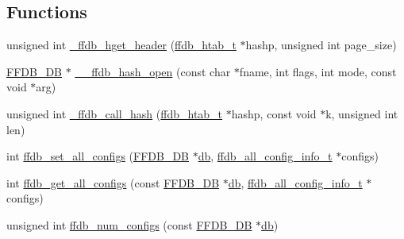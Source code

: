 \subsection*{Functions}
\begin{DoxyCompactItemize}
\item 
unsigned int \mbox{\hyperlink{adat-devel_2other__libs_2filedb_2filehash_2ffdb__hash_8c_a62b95f19364737720151b6cdd62015ea}{\+\_\+ffdb\+\_\+hget\+\_\+header}} (\mbox{\hyperlink{adat-devel_2other__libs_2filedb_2filehash_2ffdb__hash_8h_ae592010ed2bedc975d3cc0b7d074b9d1}{ffdb\+\_\+htab\+\_\+t}} $\ast$hashp, unsigned int page\+\_\+size)
\item 
\mbox{\hyperlink{adat-devel_2other__libs_2filedb_2filehash_2ffdb__db_8h_a0b27b956926453a7a8141ea8e10f0df8}{F\+F\+D\+B\+\_\+\+DB}} $\ast$ \mbox{\hyperlink{adat-devel_2other__libs_2filedb_2filehash_2ffdb__hash_8c_ae249c66e95687ce85bfd206872a6e64e}{\+\_\+\+\_\+ffdb\+\_\+hash\+\_\+open}} (const char $\ast$fname, int flags, int mode, const void $\ast$arg)
\item 
unsigned int \mbox{\hyperlink{adat-devel_2other__libs_2filedb_2filehash_2ffdb__hash_8c_a2f4a425a3740bb0320ef61b8c9fdcef1}{\+\_\+ffdb\+\_\+call\+\_\+hash}} (\mbox{\hyperlink{adat-devel_2other__libs_2filedb_2filehash_2ffdb__hash_8h_ae592010ed2bedc975d3cc0b7d074b9d1}{ffdb\+\_\+htab\+\_\+t}} $\ast$hashp, const void $\ast$k, unsigned int len)
\item 
int \mbox{\hyperlink{adat-devel_2other__libs_2filedb_2filehash_2ffdb__hash_8c_a025a0fd1b0b76b024679498011af4bc3}{ffdb\+\_\+set\+\_\+all\+\_\+configs}} (\mbox{\hyperlink{adat-devel_2other__libs_2filedb_2filehash_2ffdb__db_8h_a0b27b956926453a7a8141ea8e10f0df8}{F\+F\+D\+B\+\_\+\+DB}} $\ast$\mbox{\hyperlink{structdb}{db}}, \mbox{\hyperlink{adat-devel_2other__libs_2filedb_2filehash_2ffdb__db_8h_afc17234e7cd387e11de55b92df6bb0e5}{ffdb\+\_\+all\+\_\+config\+\_\+info\+\_\+t}} $\ast$configs)
\item 
int \mbox{\hyperlink{adat-devel_2other__libs_2filedb_2filehash_2ffdb__hash_8c_a4c5be24458701f3a88770dc202be8a0c}{ffdb\+\_\+get\+\_\+all\+\_\+configs}} (const \mbox{\hyperlink{adat-devel_2other__libs_2filedb_2filehash_2ffdb__db_8h_a0b27b956926453a7a8141ea8e10f0df8}{F\+F\+D\+B\+\_\+\+DB}} $\ast$\mbox{\hyperlink{structdb}{db}}, \mbox{\hyperlink{adat-devel_2other__libs_2filedb_2filehash_2ffdb__db_8h_afc17234e7cd387e11de55b92df6bb0e5}{ffdb\+\_\+all\+\_\+config\+\_\+info\+\_\+t}} $\ast$configs)
\item 
unsigned int \mbox{\hyperlink{adat-devel_2other__libs_2filedb_2filehash_2ffdb__hash_8c_aa3722865ae0e52878e2fc443f4f1a0a8}{ffdb\+\_\+num\+\_\+configs}} (const \mbox{\hyperlink{adat-devel_2other__libs_2filedb_2filehash_2ffdb__db_8h_a0b27b956926453a7a8141ea8e10f0df8}{F\+F\+D\+B\+\_\+\+DB}} $\ast$\mbox{\hyperlink{structdb}{db}})

\end{DoxyCompactItemize}

